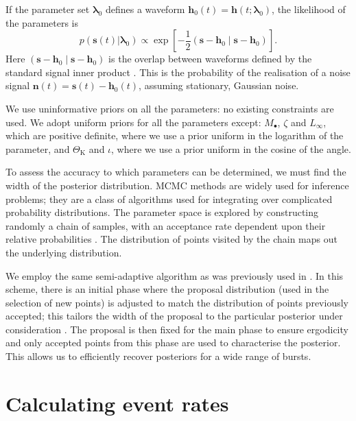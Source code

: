 \documentclass[useAMS,usedcolumn,usegraphicx,usenatbib]{mn2e}
\newcommand{\sub}[1]{\ensuremath{_\mathrm{#1}}}
\newcommand{\recip}[1]{\ensuremath{\dfrac{1}{#1}}}
\newcommand{\innerprod}[2]{\ensuremath{\left({#1}\middle|{#2}\right)}}
\begin{document}
If the parameter set $\boldsymbol{\lambda}_0$ defines a waveform $\boldsymbol{h}_0(t) = \boldsymbol{h}(t; \boldsymbol{\lambda}_0)$, the likelihood of the parameters is
\begin{equation}
p(\boldsymbol{s}(t)|\boldsymbol{\lambda}_0) \propto \exp\left[-\recip{2}\innerprod{\boldsymbol{s}-\boldsymbol{h}_0}{\boldsymbol{s}-\boldsymbol{h}_0}\right].
\label{eq:likelihood}
\end{equation}
Here $\innerprod{\boldsymbol{s}-\boldsymbol{h}_0}{\boldsymbol{s}-\boldsymbol{h}_0}$ is the overlap between waveforms defined by the standard signal inner product \citep{Cutler1994}. This is the probability of the realisation of a noise signal $\boldsymbol{n}(t) = \boldsymbol{s}(t) - \boldsymbol{h}_0(t)$, assuming stationary, Gaussian noise.

We use uninformative priors on all the parameters: no existing constraints are used. We adopt uniform priors for all the parameters except: $M_\bullet$, $\zeta$ and $L_\infty$, which are positive definite, where we use a prior uniform in the logarithm of the parameter, and $\Theta\sub{K}$ and $\iota$, where we use a prior uniform in the cosine of the angle.

To assess the accuracy to which parameters can be determined, we must find the width of the posterior distribution. MCMC methods are widely used for inference problems; they are a class of algorithms used for integrating over complicated probability distributions. The parameter space is explored by constructing randomly a chain of samples, with an acceptance rate dependent upon their relative probabilities \citep{Metropolis1953,Hastings1970}. The distribution of points visited by the chain maps out the underlying distribution.

We employ the same semi-adaptive algorithm as was previously used in \citet{Berry2013}. In this scheme, there is an initial phase where the proposal distribution (used in the selection of new points) is adjusted to match the distribution of points previously accepted; this tailors the width of the proposal to the particular posterior under consideration \citep*{Haario1999}. The proposal is then fixed for the main phase to ensure ergodicity \citep{Roberts2007,Andrieu2008} and only accepted points from this phase are used to characterise the posterior. This allows us to efficiently recover posteriors for a wide range of bursts.

\section{Calculating event rates}\label{sec:Rates}
\end{document}
